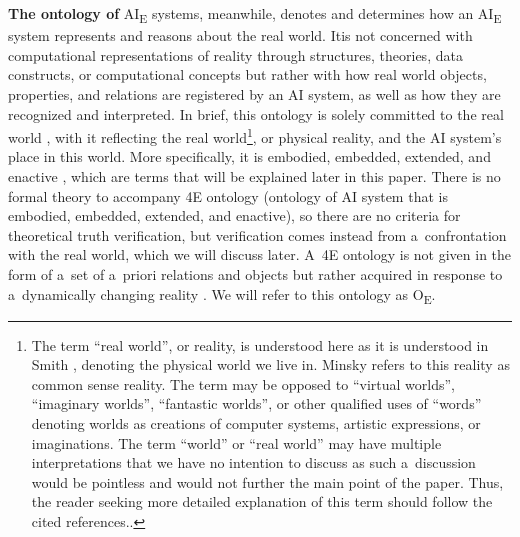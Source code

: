 {{\textbf{The ontology of} AI\textsubscript{E} systems, meanwhile, denotes and determines how an AI\textsubscript{E} system represents and reasons about the real world. Itis not concerned with computational representations of reality through structures, theories, data constructs, or computational concepts but rather with how real world objects, properties, and relations are registered by an AI system, as well as how they are recognized and interpreted. In brief, this ontology is solely committed to the real world
\parencite[in the sense explained by][p.145]{smith_promise_2019}, %
 with it reflecting the real world\footnote{ The term ``real world'', or reality, is understood here as it is understood in Smith 
\parencite*[][xiv]{smith_promise_2019}, %
 denoting the physical world we live in. Minsky 
\parencite*[][p.6]{minsky_logical_1991} %
 refers to this reality as common sense reality. The term may be opposed to ``virtual worlds'', ``imaginary worlds'', ``fantastic worlds'', or other qualified uses of ``words'' denoting worlds as creations of computer systems, artistic expressions, or imaginations. The term ``world'' or ``real world'' may have multiple interpretations that we have no intention to discuss as such a~discussion would be pointless and would not further the main point of the paper. Thus, the reader seeking more detailed explanation of this term should follow the cited references..}, or physical reality, and the AI system's place in this world. More specifically, it is embodied, embedded, extended, and enactive 
\parencite[][p.43]{smith_promise_2019}, %
 which are terms that will be explained later in this paper. There is no formal theory to accompany 4E ontology (ontology of AI system that is embodied, embedded, extended, and enactive), so there are no criteria for theoretical truth verification, but verification comes instead from a~confrontation with the real world, which we will discuss later. A~4E ontology is not given in the form of a~set of a~priori relations and objects but rather acquired 
\parencite[][]{smith_promise_2019} %
 in response to a~dynamically changing reality 
\parencites[see][as well as]{minsky_logical_1991}[][]{boltuc_conscious_2020}. %
 We will refer to this ontology as O\textsubscript{E}.

}}
